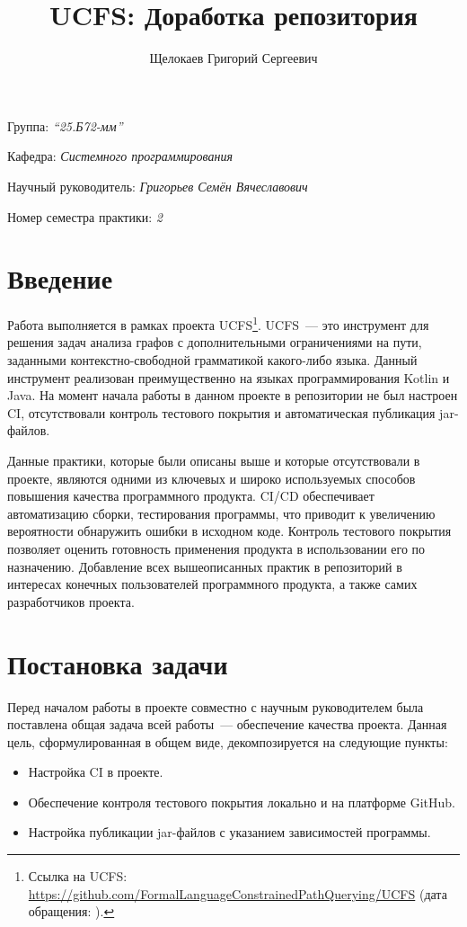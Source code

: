 \documentclass[a4paper]{article}
\title{UCFS: Доработка репозитория}
\author{Щелокаев Григорий Сергеевич}
\date{}
\begin{document}
\maketitle

\begin{flushright}
    Группа: \emph{\enquote{25.Б72-мм}}

    Кафедра: \emph{Системного программирования}

    Научный руководитель: \emph{Григорьев Семён Вячеславович}

    Номер семестра практики: \emph{2}
\end{flushright} 


\section{Введение}

Работа выполняется в рамках проекта UCFS\footnote{Ссылка на UCFS: \url{https://github.com/FormalLanguageConstrainedPathQuerying/UCFS} (дата обращения: ).}. UCFS~--- это инструмент для решения задач анализа графов с дополнительными ограничениями на пути, заданными контекстно-свободной грамматикой какого-либо языка. Данный инструмент реализован преимущественно на языках программирования Kotlin и Java.
На момент начала работы в данном проекте в репозитории не был настроен CI, отсутствовали контроль тестового покрытия и автоматическая публикация jar-файлов.

Данные практики, которые были описаны выше и которые отсутствовали в проекте, являются одними из ключевых и широко используемых способов повышения качества программного продукта. CI/CD обеспечивает автоматизацию сборки, тестирования программы, что приводит к увеличению вероятности обнаружить ошибки в исходном коде. Контроль тестового покрытия позволяет оценить готовность применения продукта в использовании его по назначению. Добавление всех вышеописанных практик в репозиторий в интересах конечных пользователей программного продукта, а также самих разработчиков проекта.

\section{Постановка задачи}

Перед началом работы в проекте совместно с научным руководителем была поставлена общая задача всей работы~--- обеспечение качества проекта. Данная цель, сформулированная в общем виде, декомпозируется на следующие пункты:
\begin{itemize}
    \item Настройка CI в проекте.
    \item Обеспечение контроля тестового покрытия локально и на платформе GitHub.
    \item Настройка публикации jar-файлов с указанием зависимостей программы.
\end{itemize}
\end{document}
